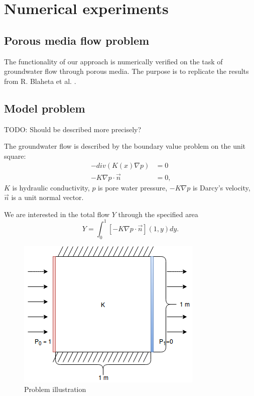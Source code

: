 \documentclass{article}
\def\todo#1{{\color{red}TODO: #1}}
\begin{document}
\section{Numerical experiments}

\subsection{Porous media flow problem}
The functionality of our approach is numerically verified on the task of groundwater flow through porous media. The purpose is to replicate the results from R. Blaheta et al. \cite{Blaheta20160413}.

\subsection{Model problem}\label{model_problem}
\todo{Should be described more precisely?}

The groundwater flow is described by the boundary value problem on the unit square:
\begin{align}
-div(K(x)\nabla p) &= 0 \\ \nonumber
-K \nabla p  \cdot \vec{n} &= 0\text{,}
\end{align}
$K$ is hydraulic conductivity, $p$ is pore water pressure, $-K \nabla p$ is Darcy’s velocity, $\vec{n}$ is a unit normal vector.

We are interested in the total flow $Y$ through the specified area
\begin{equation}
Y = \int_{0}^{1}[-K\nabla p \cdot \vec{n}] (1, y) dy\text{.}
\end{equation}

\begin{figure}[!htp]
\centering
\includegraphics[width=0.5\linewidth]{porous_media_flow/problem_illustration.png}
\caption{Problem illustration}
\label{fig:benchmark_task}
\centering
\end{figure}
\FloatBarrier
\end{document}
